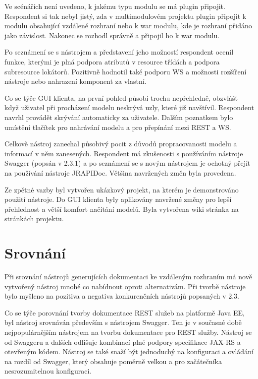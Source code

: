 \documentclass[11pt,twoside,a4paper]{book}
\begin{document}
Ve scénářích není uvedeno, k jakému typu modulu se má plugin připojit. Respondent si tak
nebyl jistý, zda v multimodulovém projektu plugin připojit k modulu obsahující vzdálené
rozhraní nebo k war modulu, kde je rozhraní přidáno jako závislost. Nakonec se rozhodl
správně a připojil ho k war modulu.

Po seznámení se s nástrojem a představení jeho možností respondent ocenil funkce, kterými je
plná podpora atributů v resource třídách a podpora subresource lokátorů. Pozitivně hodnotil
také podporu WS a možnosti rozšíření nástroje nebo nahrazení komponent za vlastní.

Co se týče GUI klienta, na první pohled působí trochu nepřehledně, obzvlášť když uživatel při
procházení modelu neskrývá uzly, které již navštívil. Respondent navrhl provádět skrývání
automaticky za uživatele. Dalším poznatkem bylo umístění tlačítek pro nahrávání modelu a
pro přepínání mezi REST a WS.

Celkově nástroj zanechal působivý pocit z důvodů propracovanosti modelu a informací v něm
zanesených. Respondent má zkušenosti s používáním nástroje Swagger (popsán v 2.3.1) a po
seznámení se s novým nástrojem je ochotný přejít na používání nástroje JRAPIDoc. Většina
navržených změn byla provedena.

Ze zpětné vazby byl vytvořen ukázkový projekt, na kterém je demonstrováno použití nástroje.
Do GUI klienta byly aplikovány navržené změny pro lepší přehlednost a větší komfort
načítání modelů. Byla vytvořena wiki stránka na stránkách projektu.

\chapter{Srovnání}

Při srovnání nástrojů generujících dokumentaci ke vzdáleným rozhraním má nově vytvořený
nástroj mnohé co nabídnout oproti alternativám. Při tvorbě nástroje bylo myšleno na pozitiva
a negativa konkurenčních nástrojů popsaných v 2.3.

Co se týče porovnání tvorby dokumentace REST služeb na platformě Java EE, byl
nástroj srovnáván především s nástrojem Swagger. Ten je v současné době
nejpopulárnějším nástrojem na tvorbu dokumentace pro REST služby. Nástroj se od Swaggeru a dalších odlišuje kombinací plné podpory specifikace JAX-RS a otevřeným kódem. Nástroj se také
snaží být jednoduchý na konfiguraci a ovládání na rozdíl od Swagger, který obsahuje poměrně
velkou a pro začátečníka nesrozumitelnou konfiguraci.
\end{document}
